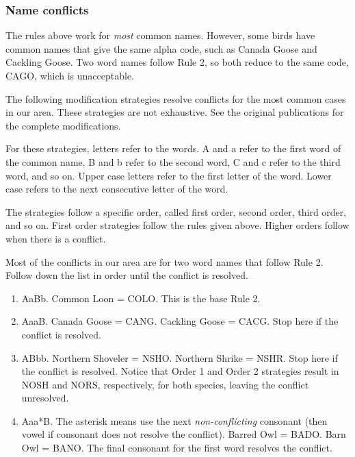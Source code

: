 \documentclass[11pt]{article}
\begin{document}
\subsubsection*{Name conflicts}

The rules above work for \emph{most} common names. However, some birds have common names that give the same alpha code, such as Canada Goose and Cackling Goose. Two word names follow Rule 2, so both reduce to the same code, CAGO, which is unacceptable.

The following modification strategies resolve conflicts for the most common cases in our area.  These strategies are not exhaustive. See the original publications for the complete modifications.

For these strategies, letters refer to the words. A and a refer to the first word of the common name. B and b refer to the second word, C and c refer to the third word, and so on. Upper case letters refer to the first letter of the word. Lower case refers to the next consecutive letter of the word.

The strategies follow a specific order, called first order, second order, third order, and so on. First order strategies follow the rules given above. Higher orders follow when there is a conflict.

Most of the conflicts in our area are for two word names that follow Rule 2. Follow down the list in order until the conflict is resolved.

\begin{enumerate}[label={Order \arabic*:}]
\item AaBb. Common Loon = COLO. This is the base Rule 2.

\item AaaB. Canada Goose = CANG. Cackling Goose = CACG. Stop here if the conflict is resolved.

\item ABbb. Northern Shoveler = NSHO. Northern Shrike = NSHR. Stop here if the conflict is resolved. Notice that Order 1 and Order 2 strategies result in NOSH and NORS, respectively, for both species, leaving the conflict unresolved. 

\item Aaa*B. The asterisk means use the next \emph{non-conflicting} consonant (then vowel if consonant does not resolve the conflict). Barred Owl = BADO. Barn Owl = BANO. The final consonant for the first word resolves the conflict. 

\end{enumerate}
\end{document}
